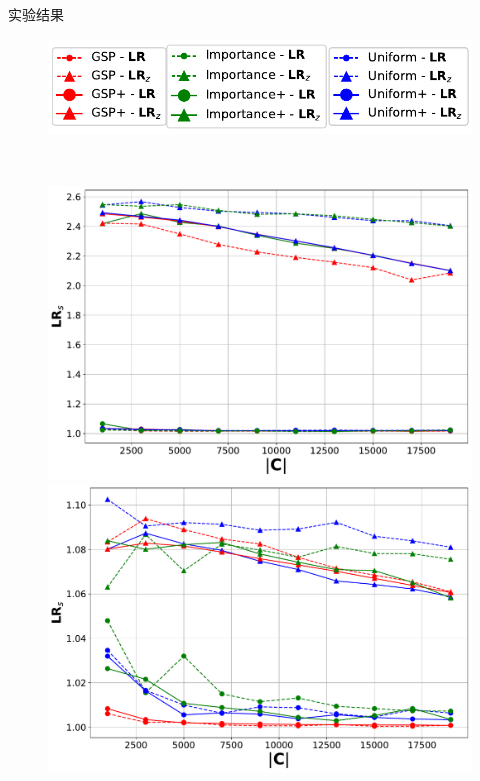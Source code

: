 \documentclass[aspectratio=169]{ctexbeamer}
\begin{document}
\begin{frame}{实验结果}

\begin{figure}
  
  \centering
    \begin{minipage}{0.8\linewidth}
        \centering
        \includegraphics[width=0.5\linewidth]{./figures/legend.pdf}
    \end{minipage}
    \\
    \begin{minipage}{0.49\linewidth}
        \centering
        \includegraphics[width=0.85\linewidth]{./figures/loss_ratio(0.05,0.2) - MNIST.pdf}
    \end{minipage}
    \hfill
    \begin{minipage}{0.49\linewidth}
        \centering
        \includegraphics[width=0.85\linewidth]{./figures/loss_ratio(0.2,0.05) - MNIST.pdf}
    \end{minipage}
    \label{fig:mnist_combined}
\end{figure}
\end{frame}
\end{document}
